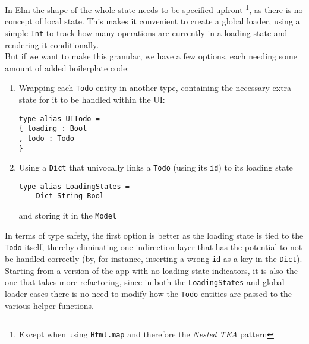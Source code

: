 In Elm the shape of the whole state needs to be specified upfront \footnote{Except when using \texttt{Html.map} and therefore the \textit{Nested TEA} pattern}\cite{noauthor_elm_nodate}, as there is no concept of local state. This makes it convenient to create a global loader, using a simple \texttt{Int} to track how many operations are currently in a loading state and rendering it conditionally. \\
But if we want to make this granular, we have a few options, each needing some amount of added boilerplate code:
\begin{enumerate}
    \item Wrapping each \texttt{Todo} entity in another type, containing the necessary extra state for it to be handled within the UI:
    \begin{verbatim}
type alias UITodo =
{ loading : Bool
, todo : Todo
}
    \end{verbatim}
    \item Using a \texttt{Dict} that univocally links a \texttt{Todo} (using its \texttt{id}) to its loading state
    \begin{verbatim}
type alias LoadingStates =
    Dict String Bool
    \end{verbatim}
    and storing it in the \texttt{Model}
\end{enumerate} 

In terms of type safety, the first option is better as the loading state is tied to the \texttt{Todo} itself, thereby eliminating one indirection layer that has the potential to not be handled correctly (by, for instance, inserting a wrong \texttt{id} as a key in the \texttt{Dict}). \\
Starting from a version of the app with no loading state indicators, it is also the one that takes more refactoring, since in both the \texttt{LoadingStates} and global loader cases there is no need to modify how the \texttt{Todo} entities are passed to the various helper functions. \\

